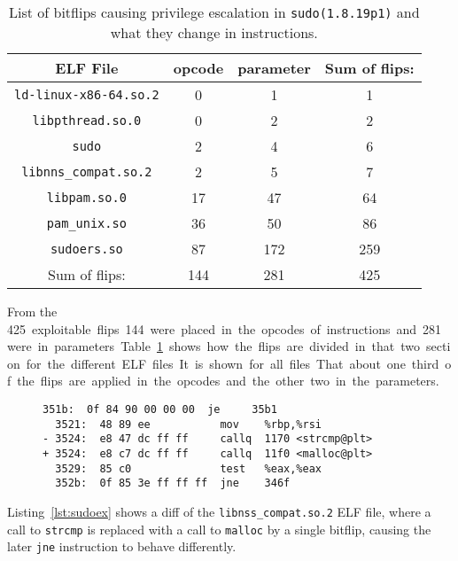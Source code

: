 \begin{table}[!htb]
\centering
\begin{tabular}{c|cc|c}
ELF File & opcode & parameter & Sum of flips: \\ \hline
\texttt{ld-linux-x86-64.so.2} & 0 & 1  & 1    \\
\texttt{libpthread.so.0}      & 0 & 2  & 2    \\
\texttt{sudo}                 & 2 & 4  & 6    \\
\texttt{libnns\_compat.so.2}  & 2 & 5  & 7    \\
\texttt{libpam.so.0}          & 17 & 47   & 64   \\
\texttt{pam\_unix.so}         & 36 & 50   & 86   \\
\texttt{sudoers.so}           & 87 & 172  & 259  \\ \hline
Sum of flips:                 & 144 & 281 & 425
\end{tabular}
\caption{List of bitflips causing privilege escalation in
\texttt{sudo(1.8.19p1)} and what they change in instructions.}
\label{tab:sudoflip}
\end{table}

From the \SI{425} exploitable flips \SI{144} were placed in the opcodes of
instructions and \SI{281} were in parameters. Table~\ref{tab:sudoflip} shows how
the flips are divided in that two section for the different ELF files. It is
shown for all files. That about one third of the flips are applied in the
opcodes and the other two in the parameters.

\begin{figure}
\begin{minipage}{\linewidth}
\begin{lstlisting}[style=diff,
                   caption={Diff for a bitflip applied to
\texttt{libnss\_compat.so.2} in order to bypass a user privilege check. The call
to \texttt{strcmp} is exchanged because the offset used for the lookuptable
is flipped.},
label=lst:sudoex]
  351b:  0f 84 90 00 00 00  je     35b1
  3521:  48 89 ee           mov    %rbp,%rsi
- 3524:  e8 47 dc ff ff     callq  1170 <strcmp@plt>
+ 3524:  e8 c7 dc ff ff     callq  11f0 <malloc@plt>
  3529:  85 c0              test   %eax,%eax
  352b:  0f 85 3e ff ff ff  jne    346f
\end{lstlisting}
\end{minipage}
\end{figure}

Listing~\ref{lst:sudoex} shows a diff of the \texttt{libnss\_compat.so.2} ELF
file, where a call to \texttt{strcmp} is replaced with a call to \texttt{malloc}
by a single bitflip, causing the later \texttt{jne} instruction to behave
differently.


